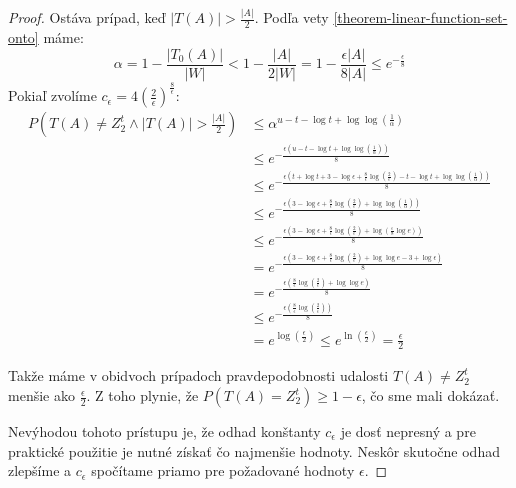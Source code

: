 \begin{proof}
Ostáva prípad, keď $|T(A)| > \frac{|A|}{2}$. Podľa vety \ref{theorem-linear-function-set-onto} máme:
\begin{displaymath}
\alpha = 1 - \frac{|T_0(A)|}{|W|} < 1 - \frac{|A|}{2|W|} = 1 - \frac{\epsilon |A|}{8|A|} \leq e^{-\frac{\epsilon}{8}}
\end{displaymath}
Pokiaľ zvolíme $c_\epsilon = 4\left(\frac{2}{\epsilon}\right)^{\frac{8}{\epsilon}}$:
\begin{displaymath}
\begin{split}
P(T(A) \neq Z_2^t \wedge |T(A)| > \frac{|A|}{2}) 
	& \leq \alpha ^ {u - t - \log t + \log\log\left(\frac{1}{\alpha}\right)} \\
	& \leq e^{-\frac{\epsilon\left(u - t - \log t + \log\log\left(\frac{1}{\alpha}\right)\right)}{8}}	\\
	& \leq e^{-\frac{\epsilon\left(t + \log t + 3 - \log \epsilon + \frac{8}{\epsilon}\log\left(\frac{2}{\epsilon}\right) -t - \log t  + \log\log\left(\frac{1}{\alpha}\right)\right)}{8}} \\
	& \leq e^{-\frac{\epsilon \left(3 - \log \epsilon + \frac{8}{\epsilon}\log\left(\frac{2}{\epsilon}\right) + \log\log\left(\frac{1}{\alpha}\right) \right)}{8}} \\
	& \leq e^{-\frac{\epsilon \left(3 - \log \epsilon + \frac{8}{\epsilon}\log\left(\frac{2}{\epsilon}\right) + \log\left(\frac{\epsilon}{8} \log e \right) \right)}{8}} \\
	& =    e^{-\frac{\epsilon \left(3 - \log \epsilon + \frac{8}{\epsilon}\log\left(\frac{2}{\epsilon}\right) + \log\log e - 3 + \log \epsilon \right)}{8}} \\
	& =    e^{-\frac{\epsilon \left(                    \frac{8}{\epsilon}\log\left(\frac{2}{\epsilon}\right) + \log\log e \right)}{8}} \\
	& \leq e^{-\frac{\epsilon \left(                    \frac{8}{\epsilon}\log\left(\frac{2}{\epsilon}\right) \right)}{8}} \\
	& = e^{{\log\left(\frac{\epsilon}{2}\right)}} 
	\leq e^{\ln\left(\frac{\epsilon}{2}\right)} 
	= \frac{\epsilon}{2}
\end{split}
\end{displaymath}

Takže máme v obidvoch prípadoch pravdepodobnosti udalosti $T(A) \neq Z_2^t$ menšie ako $\frac{\epsilon}{2}$. Z toho plynie, že $P(T(A) = Z_2^t) \geq 1 - \epsilon$, čo sme mali dokázať.

Nevýhodou tohoto prístupu je, že odhad konštanty $c_\epsilon$ je dosť nepresný a pre praktické použitie je nutné získať čo najmenšie hodnoty. Neskôr skutočne odhad zlepšíme a $c_\epsilon$ spočítame priamo pre požadované hodnoty $\epsilon$.
\end{proof}


